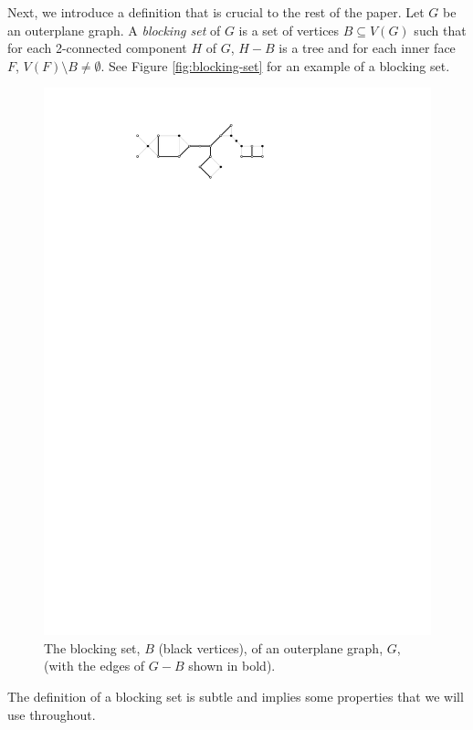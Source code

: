 \documentclass{patmorin}
\begin{document}
Next, we introduce a definition that is crucial to the rest of the paper.
Let $G$ be an outerplane graph. A \emph{blocking set} of $G$ is a set
of vertices $B \subseteq V(G)$ such that for each 2-connected component
$H$ of $G$, $H-B$ is a tree and for each inner face $F$,
$V(F) \setminus B \ne \emptyset$.  See Figure \ref{fig:blocking-set}
for an example of a blocking set.

\begin{figure}
  \begin{center}
     \includegraphics{figs/blocking-set-1}
  \end{center}
  \caption{The blocking set, $B$ (black vertices), of an outerplane graph,
     $G$,  (with the edges of $G-B$ shown in bold).}
\end{figure}

The definition of a blocking set is subtle and implies some properties
that we will use throughout.   
\end{document}
